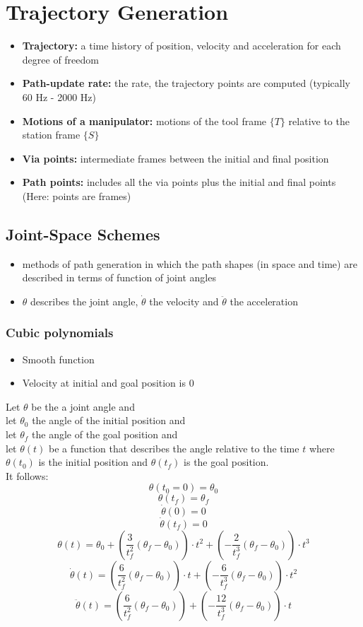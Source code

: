 \documentclass[10pt,a4paper]{article}
\begin{document}
\section{Trajectory Generation}
\begin{itemize}
	\item \textbf{Trajectory:} a time history of position, velocity and acceleration for each degree of freedom
	\item \textbf{Path-update rate:} the rate, the trajectory points are computed (typically 60 Hz - 2000 Hz)
	\item \textbf{Motions of a manipulator:} motions of the tool frame $\{T\}$ relative to the station frame $\{S\}$
	\item \textbf{Via points:} intermediate frames between the initial and final position
	\item \textbf{Path points:} includes all the via points plus the initial and final points (Here: points are frames)
\end{itemize}

\subsection{Joint-Space Schemes}
\begin{itemize}
	\item methods of path generation in which the path shapes (in space and time) are described in terms of function of joint angles
	\item $\theta$ describes the joint angle, $\dot{\theta}$ the velocity and $\ddot{\theta}$ the acceleration
\end{itemize}

\subsubsection{Cubic polynomials}
\begin{itemize}
	\item Smooth function
	\item Velocity at initial and goal position is 0
\end{itemize}
Let $\theta$ be the a joint angle and \\
let $\theta_0$ the angle of the initial position and \\
let $\theta_f$ the angle of the goal position and \\
let $\theta(t)$ be a function that describes the angle relative to the time $t$ where $\theta(t_0)$ is the initial position and $\theta(t_f)$ is the goal position. \\
It follows: \\
$$
	\theta(t_0 = 0) = \theta_0
$$
$$
	\theta(t_f) = \theta_f
$$
$$
	\dot{\theta}(0) = 0
$$
$$
	\dot{\theta}(t_f) = 0
$$
$$
	\theta(t) = \theta_0 + \left(\frac{3}{t_f^2}(\theta_f - \theta_0)\right) ⋅ t^2 + \left(-\frac{2}{t_f^3}(\theta_f - \theta_0)\right) ⋅ t^3
$$
$$
	\dot{\theta}(t) = \left(\frac{6}{t_f^2}(\theta_f - \theta_0)\right) ⋅ t + \left(-\frac{6}{t_f^3}(\theta_f - \theta_0)\right) ⋅ t^2
$$
$$
	\ddot{\theta}(t) = \left(\frac{6}{t_f^2}(\theta_f - \theta_0)\right) + \left(-\frac{12}{t_f^3}(\theta_f - \theta_0)\right) ⋅ t
$$
\end{document}
